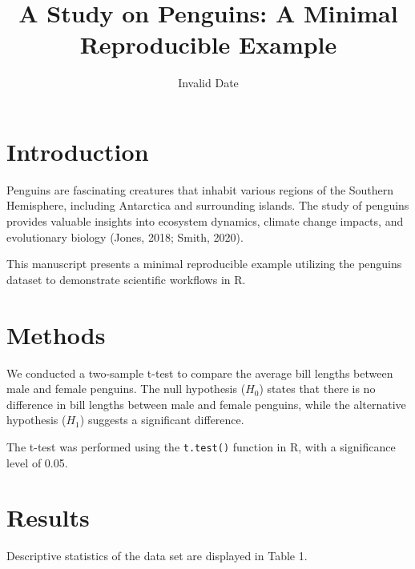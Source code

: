 \documentclass[
  man,
  longtable,
  nolmodern,
  notxfonts,
  notimes,
  colorlinks=true,linkcolor=blue,citecolor=blue,urlcolor=blue]{apa7}
\title{A Study on Penguins: A Minimal Reproducible Example}
\date{Invalid Date}
\begin{document}
\maketitle


\setcounter{secnumdepth}{-\maxdimen} %

\setlength\LTleft{0pt}




\section{Introduction}\label{introduction}

Penguins are fascinating creatures that inhabit various regions of the
Southern Hemisphere, including Antarctica and surrounding islands. The
study of penguins provides valuable insights into ecosystem dynamics,
climate change impacts, and evolutionary biology (Jones, 2018; Smith,
2020).

This manuscript presents a minimal reproducible example utilizing the
penguins dataset to demonstrate scientific workflows in R.

\section{Methods}\label{methods}

We conducted a two-sample t-test to compare the average bill lengths
between male and female penguins. The null hypothesis (\(H_0\)) states
that there is no difference in bill lengths between male and female
penguins, while the alternative hypothesis (\(H_1\)) suggests a
significant difference.

The t-test was performed using the \texttt{t.test()} function in R, with
a significance level of 0.05.

\section{Results}\label{results}

Descriptive statistics of the data set are displayed in Table 1.
\end{document}
